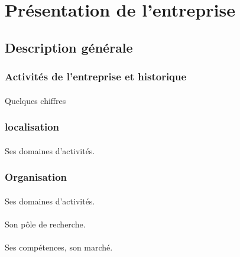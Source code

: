 \section{Présentation de l'entreprise}


    \subsection{Description générale}
        \subsubsection{Activités de l'entreprise et historique}
            \paragraph{}
            Quelques chiffres

            \paragraph{}

        \subsubsection{localisation}
            \paragraph{}
            Ses domaines d'activités.
            \paragraph{}

        \subsubsection{Organisation}
            \paragraph{}
            Ses domaines d'activités.
            \paragraph{}

            Son pôle de recherche.
            \paragraph{}
            Ses compétences, son marché.
